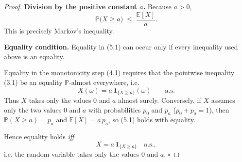 \begin{proof}
\medskip
\textbf{Division by the positive constant \(a\).}  Because \(a>0\),
\begin{equation*}
\mathbb P\!\bigl(X\ge a\bigr)\;\le\;\frac{\mathbb E[X]}{a}.
\tag{5.1}
\end{equation*}
This is precisely Markov’s inequality.

\medskip
\textbf{Equality condition.}  Equality in (5.1) can occur only if every
inequality used above is an equality.

Equality in the monotonicity step (4.1) requires that the pointwise
inequality (3.1) be an equality \(\mathbb P\)-almost everywhere, i.e.
\begin{equation*}
X(\omega)=a\,\mathbf 1_{\{X\ge a\}}(\omega)\qquad\text{a.s.}
\tag{6.1}
\end{equation*}
Thus \(X\) takes only the values \(0\) and \(a\) almost surely.  Conversely,
if \(X\) assumes only the two values \(0\) and \(a\) with probabilities
\(p_{0}\) and \(p_{a}\) (\(p_{0}+p_{a}=1\)), then
\(\mathbb P(X\ge a)=p_{a}\) and \(\mathbb E[X]=a\,p_{a}\), so (5.1) holds
with equality.

Hence equality holds \emph{iff}
\[
X=a\,\mathbf 1_{\{X\ge a\}}\quad\text{a.s.},
\]
i.e. the random variable takes only the values \(0\) and \(a\). \(\square\)
\end{proof}